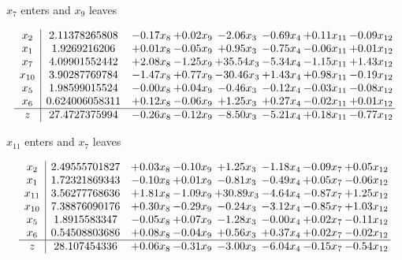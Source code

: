 \documentclass[9pt]{article}
\begin{document}
 $ x_{7} $ enters and $ x_{9} $ leaves 

 \[\begin{array}{c| c c@{\hskip 2pt} c@{\hskip 2pt} c@{\hskip 2pt} c@{\hskip 2pt} c@{\hskip 2pt} c@{\hskip 2pt} }
 x_{2}   &  2.11378265808 & -0.17 x_{8} & +  0.02 x_{9} & -2.06 x_{3} & -0.69 x_{4} & +  0.11 x_{11} & -0.09 x_{12}\\
 x_{1}   &  1.9269216206 & +  0.01 x_{8} & -0.05 x_{9} & +  0.95 x_{3} & -0.75 x_{4} & -0.06 x_{11} & +  0.01 x_{12}\\
 x_{7}   &  4.09901552442 & +  2.08 x_{8} & -1.25 x_{9} & + 35.54 x_{3} & -5.34 x_{4} & -1.15 x_{11} & +  1.43 x_{12}\\
 x_{10}   &  3.90287769784 & -1.47 x_{8} & +  0.77 x_{9} & -30.46 x_{3} & +  1.43 x_{4} & +  0.98 x_{11} & -0.19 x_{12}\\
 x_{5}   &  1.98599015524 & -0.00 x_{8} & +  0.04 x_{9} & -0.46 x_{3} & -0.12 x_{4} & -0.03 x_{11} & -0.08 x_{12}\\
 x_{6}   &  0.624006058311 & +  0.12 x_{8} & -0.06 x_{9} & +  1.25 x_{3} & +  0.27 x_{4} & -0.02 x_{11} & +  0.01 x_{12}\\
\hline
z    &  27.4727375994 & -0.26 x_{8} & -0.12 x_{9} & -8.50 x_{3} & -5.21 x_{4} & +  0.18 x_{11} & -0.77 x_{12}\\
\end{array}\]


 $ x_{11} $ enters and $ x_{7} $ leaves 

 \[\begin{array}{c| c c@{\hskip 2pt} c@{\hskip 2pt} c@{\hskip 2pt} c@{\hskip 2pt} c@{\hskip 2pt} c@{\hskip 2pt} }
 x_{2}   &  2.49555701827 & +  0.03 x_{8} & -0.10 x_{9} & +  1.25 x_{3} & -1.18 x_{4} & -0.09 x_{7} & +  0.05 x_{12}\\
 x_{1}   &  1.72321869343 & -0.10 x_{8} & +  0.01 x_{9} & -0.81 x_{3} & -0.49 x_{4} & +  0.05 x_{7} & -0.06 x_{12}\\
 x_{11}   &  3.56277768636 & +  1.81 x_{8} & -1.09 x_{9} & + 30.89 x_{3} & -4.64 x_{4} & -0.87 x_{7} & +  1.25 x_{12}\\
 x_{10}   &  7.38876090176 & +  0.30 x_{8} & -0.29 x_{9} & -0.24 x_{3} & -3.12 x_{4} & -0.85 x_{7} & +  1.03 x_{12}\\
 x_{5}   &  1.8915583347 & -0.05 x_{8} & +  0.07 x_{9} & -1.28 x_{3} & -0.00 x_{4} & +  0.02 x_{7} & -0.11 x_{12}\\
 x_{6}   &  0.54508803686 & +  0.08 x_{8} & -0.04 x_{9} & +  0.56 x_{3} & +  0.37 x_{4} & +  0.02 x_{7} & -0.02 x_{12}\\
\hline
z    &  28.107454336 & +  0.06 x_{8} & -0.31 x_{9} & -3.00 x_{3} & -6.04 x_{4} & -0.15 x_{7} & -0.54 x_{12}\\
\end{array}\]
\end{document}
